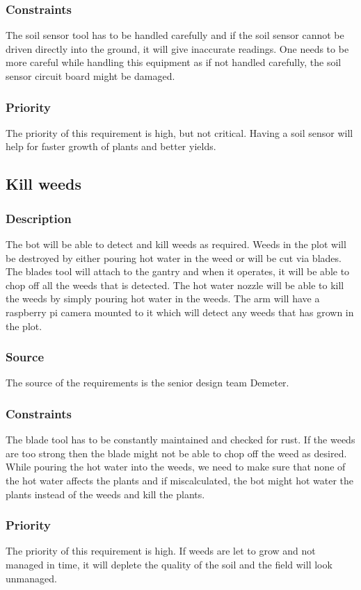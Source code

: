 \subsubsection{Constraints}
The soil sensor tool has to be handled carefully and if the soil sensor cannot be driven directly into the ground, it will give inaccurate readings. One needs to be more careful while handling this equipment as if not handled carefully, the soil sensor circuit board might be damaged.
\subsubsection{Priority}
The priority of this requirement is high, but not critical. Having a soil sensor will help for faster growth of plants and better yields.

\subsection{Kill weeds}
\subsubsection{Description}
The bot will be able to detect and kill weeds as required. Weeds in the plot will be destroyed by either pouring hot water in the weed or will be cut via blades. The blades tool will attach to the gantry and when it operates, it will be able to chop off all the weeds that is detected. The hot water nozzle will be able to kill the weeds by simply pouring hot water in the weeds. The arm will have a raspberry pi camera mounted to it which will detect any weeds that has grown in the plot.
\subsubsection{Source}
The source of the requirements is the senior design team Demeter.
\subsubsection{Constraints}
The blade tool has to be constantly maintained and checked for rust. If the weeds are too strong then the blade might not be able to chop off the weed as desired. While pouring the hot water into the weeds, we need to make sure that none of the hot water affects the plants and if miscalculated, the bot might hot water the plants instead of the weeds and kill the plants.
\subsubsection{Priority}
The priority of this requirement is high. If weeds are let to grow and not managed in time, it will deplete the quality of the soil and the field will look unmanaged.

